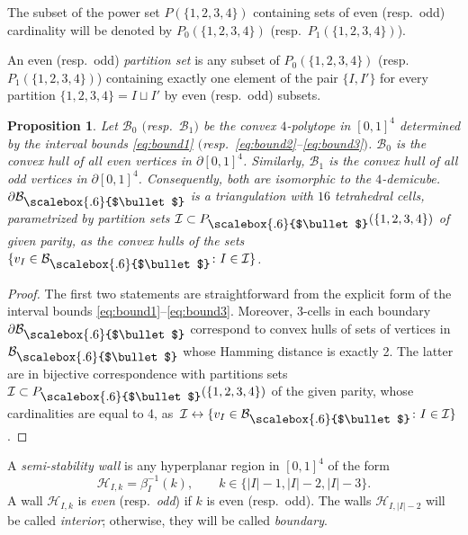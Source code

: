 \documentclass[10pt,a4paper]{amsart}
\newcommand\sbul[1][.6]{\mathbin{\vcenter{\hbox{\scalebox{#1}{$\bullet$}}}}}
\newcommand{\qB}{\mathcal{B}}
\newcommand{\qH}{\mathcal{H}}
\newcommand{\qI}{\mathcal{I}}
\numberwithin{equation}{section}
\newtheorem{Proposition}[Theorem]{Proposition}
 { \theoremstyle{definition}
\newtheorem{Definition}[Theorem]{Definition}
\newtheorem{Note}[Theorem]{Note}
\newtheorem{Example}[Theorem]{Example}
\newtheorem{Remark}[Theorem]{Remark} }
\begin{document}
The subset of the power set $P(\{1,2,3,4\})$ containing sets of even (resp.~odd) cardinality will be denoted by $P_{0}(\{1,2,3,4\})$ (resp.~$P_{1}(\{1,2,3,4\})$).

{\sloppy\begin{Definition}
An even (resp.~odd) \textit{partition set} is any subset of $P_{0}(\{1,2,3,4\})$ (resp. $P_{1}(\{1,2,3,4\})$) containing exactly one element of the pair $\{I,I'\}$ for every partition $\{1,2,3,4\}=I\sqcup I'$ by even (resp.~odd) subsets.
\end{Definition}}

\begin{Proposition} \label{prop:W-hull}
Let $\qB_{0}$ $($resp.~$\qB_{1})$ be the convex $4$-polytope in $[0,1]^{4}$ determined by the interval bounds \eqref{eq:bound1} $($resp.~\eqref{eq:bound2}--\eqref{eq:bound3}$)$.
$\qB_{0}$ is the convex hull of all even vertices in $\partial [0,1]^{4}$. Similarly, $\qB_{1}$ is the convex hull of all odd vertices in $\partial [0,1]^{4}$. Consequently, both are isomorphic to the $4$-demicube. $\partial\qB_{\sbul}$ is a triangulation with $16$ tetrahedral cells, parametrized by partition sets $\qI\subset P_{\sbul}(\{1,2,3,4\})$ of given parity, as the convex hulls of the sets $\{v_{I}\in\qB_{\sbul}\colon I\in\qI\}$.
\end{Proposition}

\begin{proof}
The first two statements are straightforward from the explicit form of the interval bounds \eqref{eq:bound1}--\eqref{eq:bound3}.
Moreover, 3-cells in each boundary $\partial\qB_{\sbul}$ correspond to convex hulls of sets of vertices in $\qB_{\sbul}$ whose Hamming distance is exactly 2. The latter are in bijective correspondence with partitions sets $\qI\subset P_{\sbul}(\{1,2,3,4\})$ of the given parity, whose cardinalities are equal to 4, as~$\qI \leftrightarrow \{v_{I}\in\qB_{\sbul}\colon I\in\qI\}$.
\end{proof}


\begin{Definition}
A \emph{semi-stability wall} is any hyperplanar region in $[0,1]^{4}$ of the form
\[
\qH_{I,k}= \beta_{I}^{-1}(k),\qquad k\in\{\vert I\vert -1, \vert I\vert -2, \vert I\vert -3\}.
\]
A wall $\qH_{I,k}$ is \emph{even} (resp.~\emph{odd}) if $k$ is even (resp.~odd). The walls $\qH_{I,\vert I\vert -2}$ will be called \emph{interior}; otherwise, they will be called \emph{boundary}.
\end{Definition}
\end{document}
